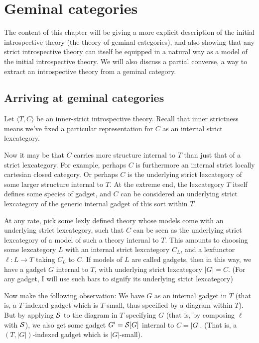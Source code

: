 \documentclass[./main.tex]{subfiles}
\begin{document}
\section{Geminal categories}
The content of this chapter will be giving a more explicit description of the initial introspective theory (the theory of geminal categories), and also showing that any strict introspective theory can itself be equipped in a natural way as a model of the initial introspective theory. We will also discuss a partial converse, a way to extract an introspective theory from a geminal category.

\subsection{Arriving at geminal categories}
\begin{observation}\label{IntrospContainsGLObservation}

Let $\langle T, C \rangle$ be an inner-strict introspective theory. Recall that inner strictness means we've fixed a particular representation for $C$ as an internal strict lexcategory.

Now it may be that $C$ carries more structure internal to $T$ than just that of a strict lexcategory. For example, perhaps $C$ is furthermore an internal strict locally cartesian closed category. Or perhaps $C$ is the underlying strict lexcategory of some larger structure internal to $T$. At the extreme end, the lexcategory $T$ itself defines some species of gadget, and $C$ can be considered an underlying strict lexcategory of the generic internal gadget of this sort within $T$.

At any rate, pick some lexly defined theory whose models come with an underlying strict lexcategory, such that $C$ can be seen as the underlying strict lexcategory of a model of such a theory internal to $T$. This amounts to choosing some lexcategory $L$ with an internal strict lexcategory $C_L$, and a lexfunctor $\ell: L \to T$ taking $C_L$ to $C$. If models of $L$ are called gadgets, then in this way, we have a gadget $G$ internal to $T$, with underlying strict lexcategory $|G| = C$. (For any gadget, I will use such bars to signify its underlying strict lexcategory)

Now make the following observation: We have $G$ as an internal gadget in $T$ (that is, a $T$-indexed gadget which is $T$-small, thus specified by a diagram within $T$). But by applying $\mathcal{S}$ to the diagram in $T$ specifying $G$ (that is, by composing $\ell$ with $\mathcal{S}$), we also get some gadget $G' = \mathcal{S}[G]$ internal to $C = |G|$. (That is, a $(T, |G|)$-indexed gadget which is $|G|$-small).


\end{observation}
\end{document}
